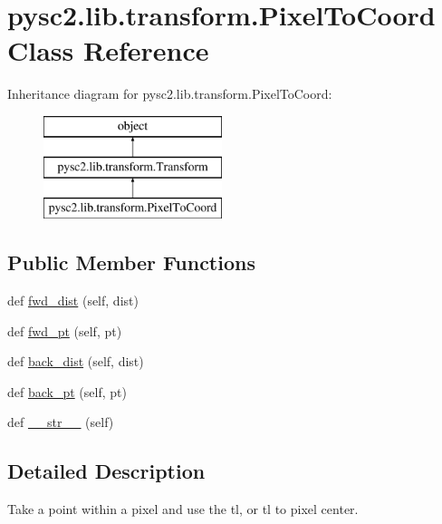 \hypertarget{classpysc2_1_1lib_1_1transform_1_1_pixel_to_coord}{}\section{pysc2.\+lib.\+transform.\+Pixel\+To\+Coord Class Reference}
\label{classpysc2_1_1lib_1_1transform_1_1_pixel_to_coord}
Inheritance diagram for pysc2.\+lib.\+transform.\+Pixel\+To\+Coord\+:\begin{figure}[H]
\begin{center}
\leavevmode
\includegraphics[height=3.000000cm]{classpysc2_1_1lib_1_1transform_1_1_pixel_to_coord}
\end{center}
\end{figure}
\subsection*{Public Member Functions}
\begin{DoxyCompactItemize}
\item 
def \mbox{\hyperlink{classpysc2_1_1lib_1_1transform_1_1_pixel_to_coord_a989286ec7cd07a77ad059ac5911189bb}{fwd\+\_\+dist}} (self, dist)
\item 
def \mbox{\hyperlink{classpysc2_1_1lib_1_1transform_1_1_pixel_to_coord_a3dd8a0723fc99be0e7a9f8718c6d27b7}{fwd\+\_\+pt}} (self, pt)
\item 
def \mbox{\hyperlink{classpysc2_1_1lib_1_1transform_1_1_pixel_to_coord_adce4b1eb4d28b6f1504f3257e8436ffb}{back\+\_\+dist}} (self, dist)
\item 
def \mbox{\hyperlink{classpysc2_1_1lib_1_1transform_1_1_pixel_to_coord_a9ab006ef8ecd006a7b82ebff60a0427b}{back\+\_\+pt}} (self, pt)
\item 
def \mbox{\hyperlink{classpysc2_1_1lib_1_1transform_1_1_pixel_to_coord_aaff3334808ec5d0a71f78c951b550570}{\+\_\+\+\_\+str\+\_\+\+\_\+}} (self)
\end{DoxyCompactItemize}


\subsection{Detailed Description}
\begin{DoxyVerb}Take a point within a pixel and use the tl, or tl to pixel center.\end{DoxyVerb}
 

